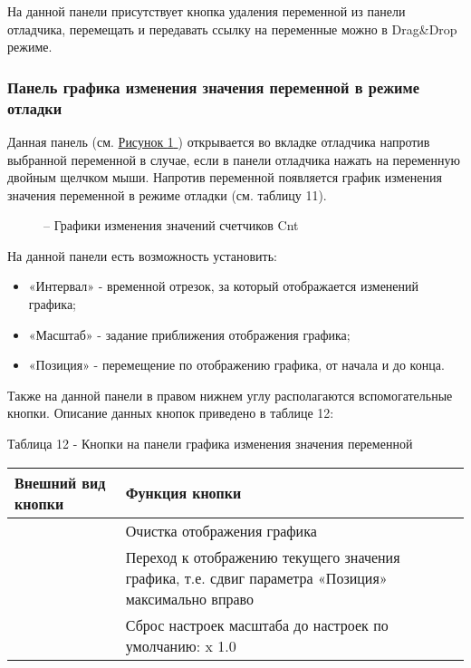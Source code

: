 \documentclass[letterpaper,10pt,russian]{sphinxmanual}
\begin{document}
На данной панели присутствует кнопка удаления переменной из панели
отладчика, перемещать и передавать ссылку на переменные можно в
Drag\&Drop режиме.


\subsubsection{Панель графика изменения значения переменной в режиме отладки}
\label{usage_guide/ide_components:id13}
Данная панель (см. \hyperref[usage_guide/ide_components:image140]{Рисунок \ref{usage_guide/ide_components:image140} }) открывается во вкладке отладчика напротив
выбранной переменной в случае, если в панели отладчика
нажать на переменную двойным щелчком мыши. Напротив переменной
появляется график изменения значения переменной в режиме отладки (см.
таблицу 11).
\begin{figure}[htbp]
\centering
\capstart

\noindent{}
\caption{– Графики изменения значений счетчиков Cnt}\label{usage_guide/ide_components:image140}\end{figure}

На данной панели есть возможность установить:
\begin{itemize}
\item {} 
«Интервал» - временной отрезок, за который отображается изменений
графика;

\item {} 
«Масштаб» - задание приближения отображения графика;

\item {} 
«Позиция» - перемещение по отображению графика, от начала и до конца.

\end{itemize}

Также на данной панели в правом нижнем углу располагаются
вспомогательные кнопки. Описание данных кнопок приведено в таблице 12:

Таблица 12 - Кнопки на панели графика изменения значения переменной

\noindent\begin{tabulary}{\linewidth}{|L|L|}
\hline
\textsf{\relax 
Внешний вид кнопки
\unskip}\relax &\textsf{\relax 
Функция кнопки
\unskip}\relax \\
\hline
{}
&
Очистка отображения графика
\\
\hline
{}
&
Переход к отображению текущего
значения графика, т.е. сдвиг
параметра «Позиция» максимально
вправо
\\
\hline
{}
&
Сброс настроек масштаба до
настроек по умолчанию: x 1.0
\\
\hline\end{tabulary}
\end{document}
